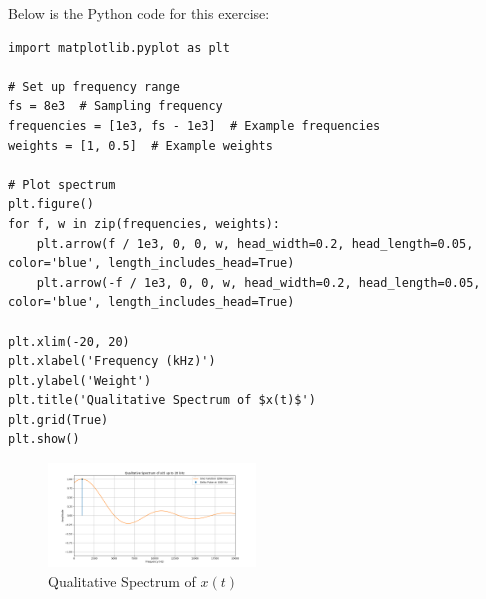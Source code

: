 
\item[(c)]
Below is the Python code for this exercise:

\begin{verbatim}
import matplotlib.pyplot as plt

# Set up frequency range
fs = 8e3  # Sampling frequency
frequencies = [1e3, fs - 1e3]  # Example frequencies
weights = [1, 0.5]  # Example weights

# Plot spectrum
plt.figure()
for f, w in zip(frequencies, weights):
    plt.arrow(f / 1e3, 0, 0, w, head_width=0.2, head_length=0.05, color='blue', length_includes_head=True)
    plt.arrow(-f / 1e3, 0, 0, w, head_width=0.2, head_length=0.05, color='blue', length_includes_head=True)

plt.xlim(-20, 20)
plt.xlabel('Frequency (kHz)')
plt.ylabel('Weight')
plt.title('Qualitative Spectrum of $x(t)$')
plt.grid(True)
plt.show()
\end{verbatim}

\begin{figure}[h]
    \centering
    \includegraphics[width=0.49\textwidth]{fig/ex3_c_plot}
    \caption{Qualitative Spectrum of \(x(t)\)}
    \label{fig:ex3_c_plot}
\end{figure}
